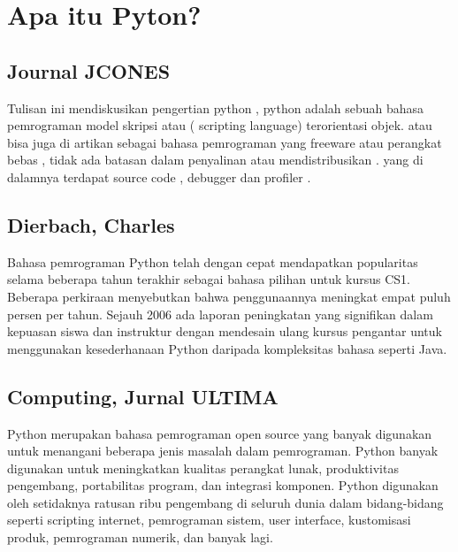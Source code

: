 \documentclass[12pt]{article}
\begin{document}
\section{Apa itu Pyton?}

\subsection{Journal JCONES}
	Tulisan ini mendiskusikan pengertian python , python adalah sebuah bahasa pemrograman model skripsi atau ( scripting language) terorientasi objek. atau bisa juga di artikan sebagai bahasa pemrograman yang freeware atau perangkat bebas , tidak ada batasan dalam penyalinan atau mendistribusikan . yang di dalamnya terdapat source code , debugger dan profiler \cite{perkasa2014rancang}.
	
\subsection{Dierbach, Charles}
Bahasa pemrograman Python telah dengan cepat mendapatkan popularitas selama beberapa tahun terakhir sebagai bahasa pilihan untuk kursus CS1. Beberapa perkiraan menyebutkan bahwa penggunaannya meningkat empat puluh persen per tahun. Sejauh 2006 ada laporan peningkatan yang signifikan dalam kepuasan siswa dan instruktur dengan mendesain ulang kursus pengantar untuk menggunakan kesederhanaan Python daripada kompleksitas bahasa seperti Java\cite{dierbach2014python}.

\subsection{Computing, Jurnal ULTIMA}
Python merupakan bahasa pemrograman open source yang banyak digunakan untuk menangani beberapa jenis masalah dalam pemrograman. Python banyak digunakan untuk meningkatkan kualitas perangkat lunak, produktivitas pengembang, portabilitas program, dan integrasi komponen. Python digunakan oleh setidaknya ratusan ribu pengembang di seluruh dunia dalam bidang-bidang seperti scripting internet, pemrograman sistem, user interface, kustomisasi produk, pemrograman numerik, dan banyak lagi\cite{computingaplikasi}.
\end{document}
